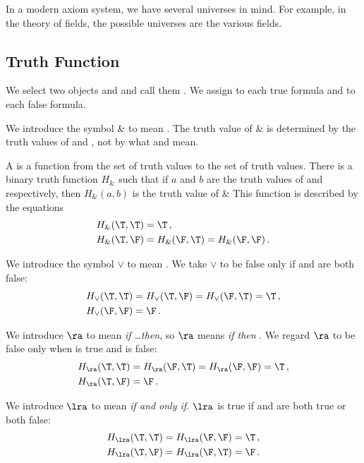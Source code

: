 In a modern axiom system, we have several universes in mind.
For example, in the theory of fields, the possible universes are the various fields.


\subsection{Truth Function}

We select two objects \T{} and \F{} and call them .
We assign \T{} to each true formula and \F{} to each false formula.

We introduce the symbol \& to mean .
The truth value of \A{} \& \B{} is determined by the truth values of \A{} and \B{}, not by what \A{} and \B{} mean.

A  is a function from the set of truth values to the set of truth values.
There is a binary truth function $H_\&$ such that if $a$ and $b$ are the truth values of \A{} and \B{} respectively, then $H_\&(a,b)$ is the truth value of \A{} \& \B{}
This function is described by the equations
\begin{align}
    H_\&(\T,\T) &= \T\,, \\
    H_\&(\T,\F) &= H_\&(\F,\T) = H_\&(\F,\F)\,.
\end{align}

We introduce the symbol $\vee$ to mean .
We take \A{} $\vee$ \B{} to be false only if \A{} and \B{} are both false:
\begin{align}
    H_\vee(\T,\T) &= H_\vee(\T,\F) = H_\vee(\F,\T) = \T\,, \\
    H_\vee(\F,\F) &= \F\,.
\end{align}

We introduce $\ra$ to mean \emph{if \dots then}, so \A{} $\ra$ \B{} means \emph{if \A{} then \B{}}.
We regard \A{} $\ra$ \B{} to be false only when \A{} is true and \B{} is false:
\begin{align}
    H_\ra(\T,\T) &= H_\ra(\F,\T) = H_\ra(\F,\F) = \T\,, \\
    H_\ra(\T,\F) &= \F\,.
\end{align}

We introduce $\lra$ to mean \emph{if and only if}. \A{} $\lra$ \B{} is true if \A{} and \B{} are both true or both false:
\begin{align}
    H_\lra(\T,\T) &= H_\lra(\F,\F) = \T\,, \\
    H_\lra(\T,\F) &= H_\lra(\F,\T) = \F\,.
\end{align}

